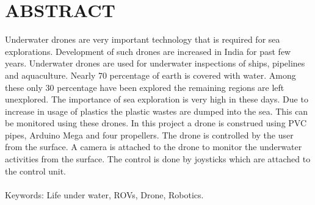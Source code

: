 % 
% 
%

\thispagestyle{empty}
\chapter*{ABSTRACT}
\large
{}
Underwater drones are very important technology that is required for sea explorations. Development of such drones are increased in India for past few years. Underwater drones are used for underwater inspections of ships, pipelines and aquaculture. Nearly 70 percentage of earth is covered with water. Among these only 30 percentage have been explored the remaining regions are left unexplored. The importance of sea exploration is very high in these days. Due to increase in usage of plastics the plastic wastes are dumped into the sea. This can be monitored using these drones. In this project a drone is construed using PVC pipes, Arduino Mega and four propellers. The drone is controlled by the user from the surface. A camera is attached to the drone to monitor the underwater activities from the surface. The control is done by joysticks which are attached to the control unit.\\\\


Keywords: Life under water, ROVs, Drone, Robotics.
\clearpage
